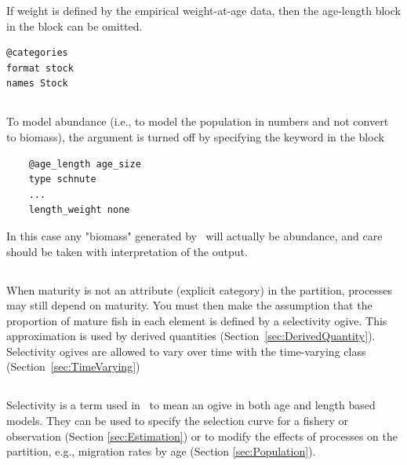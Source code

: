 If weight is defined by the empirical weight-at-age data, then the age-length block in the  block can be omitted.

{\small{\begin{verbatim}
@categories
format stock
names Stock
\end{verbatim}}}

\subsection{\label{sec:weightless-model}}

To model abundance (i.e., to model the population in numbers and not convert to biomass), the  argument is turned off by specifying the keyword  in the  block

{\small{\begin{verbatim}
	@age_length age_size
	type schnute
	...
	length_weight none
	\end{verbatim}}}

In this case any "biomass" generated by \CNAME\ will actually be abundance, and care should be taken with interpretation of the output.
\fi %

\subsection{\label{sec:maturity-notinpartition}}

When maturity is not an attribute (explicit category) in the partition, processes may still depend on maturity. You must then make the assumption that the proportion of mature fish in each element is defined by a selectivity ogive. This approximation is used by derived quantities (Section~\ref{sec:DerivedQuantity}). Selectivity ogives are allowed to vary over time with the time-varying class (Section~\ref{sec:TimeVarying})

\subsection{\label{sec:Selectivity}}

Selectivity is a term used in \CNAME\  to mean an ogive in both age and length based models. They can be used to specify the selection curve for a fishery or observation  (Section \ref{sec:Estimation}) or to modify the effects of processes on the partition, e.g., migration rates by age (Section \ref{sec:Population}). 

